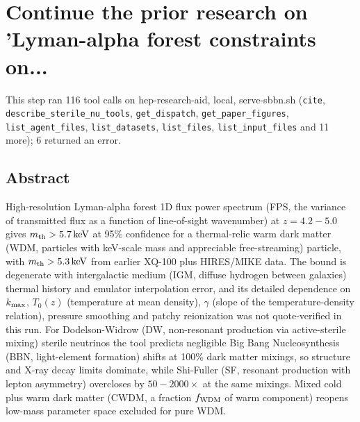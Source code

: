 \documentclass[11pt,a4paper]{article}
\begin{document}
\section{Continue the prior research on 'Lyman-alpha forest constraints on...}
This step ran 116 tool calls on hep-research-aid, local, serve-sbbn.sh (\texttt{cite}, \texttt{describe\_sterile\_nu\_tools}, \texttt{get\_dispatch}, \texttt{get\_paper\_figures}, \texttt{list\_agent\_files}, \texttt{list\_datasets}, \texttt{list\_files}, \texttt{list\_input\_files} and 11 more); 6 returned an error.\par
\subsection{Abstract}
High-resolution Lyman-alpha forest 1D flux power spectrum (FPS, the variance of transmitted flux as a function of line-of-sight wavenumber) at $z = 4.2-5.0$ gives $m_{\rm th} > 5.7\,\mathrm{keV}$ at 95\% confidence for a thermal-relic warm dark matter (WDM, particles with keV-scale mass and appreciable free-streaming) particle, with $m_{\rm th} > 5.3\,\mathrm{keV}$ from earlier XQ-100 plus HIRES/MIKE data. The bound is degenerate with intergalactic medium (IGM, diffuse hydrogen between galaxies) thermal history and emulator interpolation error, and its detailed dependence on $k_{\rm max}$, $T_0(z)$ (temperature at mean density), $\gamma$ (slope of the temperature-density relation), pressure smoothing and patchy reionization was not quote-verified in this run. For Dodelson-Widrow (DW, non-resonant production via active-sterile mixing) sterile neutrinos the tool predicts negligible Big Bang Nucleosynthesis (BBN, light-element formation) shifts at 100\% dark matter mixings, so structure and X-ray decay limits dominate, while Shi-Fuller (SF, resonant production with lepton asymmetry) overcloses by $50-2000\times$ at the same mixings. Mixed cold plus warm dark matter (CWDM, a fraction $f_{\rm WDM}$ of warm component) reopens low-mass parameter space excluded for pure WDM.
\end{document}
